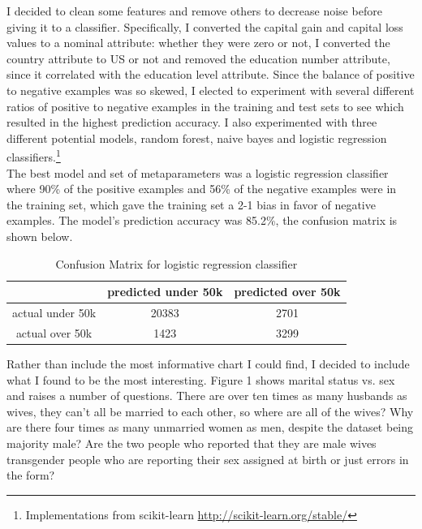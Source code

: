 \documentclass[twoside,12pt]{article}
\begin{document}
I decided to clean some features and remove others to decrease noise before giving it to a classifier. Specifically, I converted the capital gain and capital loss values to a nominal attribute: whether they were zero or not, I converted the country attribute to US or not and removed the education number attribute, since it correlated with the education level attribute. Since the balance of positive to negative examples was so skewed, I elected to experiment with several different ratios of positive to negative examples in the training and test sets to see which resulted in the highest prediction accuracy. I also experimented with three different potential models, random forest, naive bayes and logistic regression classifiers.\footnote{Implementations from scikit-learn \url{http://scikit-learn.org/stable/}}\\

The best model and set of metaparameters was a logistic regression classifier where 90\% of the positive examples and 56\% of the negative examples were in the training set, which gave the training set a 2-1 bias in favor of negative examples. The model's prediction accuracy was 85.2\%, the confusion matrix is shown below.

\begin{table}[ht]

\begin{tabular}{|c|c|c|}
    \hline
    & predicted under 50k & predicted over 50k\\
    \hline
    actual under 50k & 20383 & 2701\\
    \hline
    actual over 50k & 1423 & 3299\\
    \hline
\end{tabular}

\caption{Confusion Matrix for logistic regression classifier}

\end{table}

Rather than include the most informative chart I could find, I decided to include what I found to be the most interesting. Figure 1 shows marital status vs. sex and raises a number of questions. There are over ten times as many husbands as wives, they can't all be married to each other, so where are all of the wives? Why are there four times as many unmarried women as men, despite the dataset being majority male? Are the two people who reported that they are male wives transgender people who are reporting their sex assigned at birth or just errors in the form?
\end{document}
